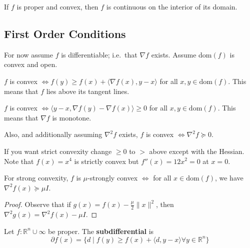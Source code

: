 \documentclass[english, 11pt]{article}
\begin{document}
  \begin{thrm}
  If $f$ is proper and convex, then $f$ is continuous on the interior of its domain.
  \end{thrm}
  
  \subsection{First Order Conditions}
 For now assume $f$ is differentiable; i.e.\ that $\nabla f$ exists. Assume dom$(f)$ is convex and open.
 
 \begin{thrm}
 $f$ is convex $\iff f(y) \ge f(x) + \langle \nabla f(x), y-x \rangle$ for all $x,y \in \text{dom}(f)$. This means that $f$ lies above its tangent lines.
 \end{thrm}
  
  \begin{thrm}
 $f$ is convex $\iff  \langle  y-x, \nabla f(y) - \nabla f(x) \rangle \ge 0$ for all $x,y \in \text{dom}(f)$. This means that $\nabla f$ is monotone.
 \end{thrm}
 
 
   \begin{thrm}
 Also, and additionally assuming $\nabla^2 f$ exists, $f$ is convex $\iff  \nabla^2 f \succeq 0$.
 \end{thrm}
  
  \begin{rem}
  If you want strict convexity change $\ge 0$ to $>$ above except with the Hessian. Note that $f(x) = x^4$ is strictly convex but $f''(x) = 12x^2 =0$ at $x=0$.
  \end{rem}
  
  \begin{rem}
  For strong convexity, $f$ is $\mu$-strongly convex $\iff$ for all $x \in \text{dom}(f)$, we have $\nabla^2 f(x) \succeq \mu I$. 
  \end{rem}
  \begin{proof}
Observe that if $g(x) = f(x) - \frac{\mu}{2} \|x\|^2$, then $\nabla^2 g(x) = \nabla^2 f(x) - \mu I$.
  \end{proof}
  
  
  \begin{defn}[Subdifferential]
  Let $f:\mathbb{R}^n \cup \infty$ be proper. The {\bf subdifferential} is
  \[ \partial f(x) = \{ d \mid f(y) \ge f(x) + \langle d, y-x \rangle \forall y \in \mathbb{R}^n \}
  \]
  \end{defn}
  
\end{document}
